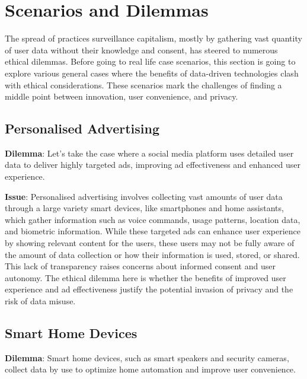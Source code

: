 \section{Scenarios and Dilemmas}\label{sec:scenarios-and-dilemmas}
The spread of practices surveillance capitalism, mostly by gathering vast quantity of user data without their knowledge and consent, has steered to numerous ethical dilemmas.
Before going to real life case scenarios, this section is going to explore various general cases where the benefits of data-driven technologies clash with ethical considerations.
These scenarios mark the challenges of finding a middle point between innovation, user convenience, and privacy.

\subsection{Personalised Advertising}\label{subsec:personalised-advertising}

\textbf{Dilemma}: Let's take the case where a social media platform uses detailed user data to deliver highly targeted ads, improving ad effectiveness and enhanced user experience.

\textbf{Issue}: Personalised advertising involves collecting vast amounts of user data through a large variety smart devices, like smartphones and home assistants, which gather information such as voice commands, usage patterns, location data, and biometric information.
While these targeted ads can enhance user experience by showing relevant content for the users, these users may not be fully aware of the amount of data collection or how their information is used, stored, or shared.
This lack of transparency raises concerns about informed consent and user autonomy.
The ethical dilemma here is whether the benefits of improved user experience and ad effectiveness justify the potential invasion of privacy and the risk of data misuse.

\subsection{Smart Home Devices}\label{subsec:smart-home-devices}

\textbf{Dilemma}: Smart home devices, such as smart speakers and security cameras, collect data by use to optimize home automation and improve user convenience.


